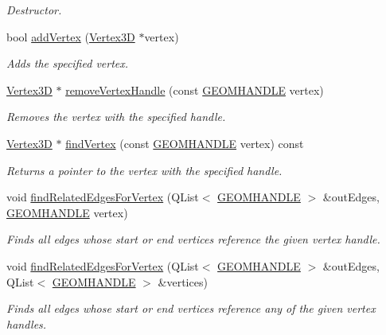 \begin{DoxyCompactItemize}
\begin{DoxyCompactList}\small\item\em Destructor. \end{DoxyCompactList}\item 
bool \hyperlink{class_solid3_d_ac02ad8ea1ca4d970c77ddc4c09b043cc}{add\-Vertex} (\hyperlink{class_vertex3_d}{Vertex3\-D} $\ast$vertex)
\begin{DoxyCompactList}\small\item\em Adds the specified vertex. \end{DoxyCompactList}\item 
\hyperlink{class_vertex3_d}{Vertex3\-D} $\ast$ \hyperlink{class_solid3_d_aefadc03bef752b5eeb52e80d67074980}{remove\-Vertex\-Handle} (const \hyperlink{vertex_8h_a72202e57358ed73cd212e9a2eaf39aeb}{G\-E\-O\-M\-H\-A\-N\-D\-L\-E} vertex)
\begin{DoxyCompactList}\small\item\em Removes the vertex with the specified handle. \end{DoxyCompactList}\item 
\hyperlink{class_vertex3_d}{Vertex3\-D} $\ast$ \hyperlink{class_solid3_d_ace3ab2ef41ff561973c10253b18add81}{find\-Vertex} (const \hyperlink{vertex_8h_a72202e57358ed73cd212e9a2eaf39aeb}{G\-E\-O\-M\-H\-A\-N\-D\-L\-E} vertex) const 
\begin{DoxyCompactList}\small\item\em Returns a pointer to the vertex with the specified handle. \end{DoxyCompactList}\item 
void \hyperlink{class_solid3_d_aa250bf5e45c3890a031ee7d10fd0a495}{find\-Related\-Edges\-For\-Vertex} (Q\-List$<$ \hyperlink{vertex_8h_a72202e57358ed73cd212e9a2eaf39aeb}{G\-E\-O\-M\-H\-A\-N\-D\-L\-E} $>$ \&out\-Edges, \hyperlink{vertex_8h_a72202e57358ed73cd212e9a2eaf39aeb}{G\-E\-O\-M\-H\-A\-N\-D\-L\-E} vertex)
\begin{DoxyCompactList}\small\item\em Finds all edges whose start or end vertices reference the given vertex handle. \end{DoxyCompactList}\item 
void \hyperlink{class_solid3_d_a84f5c532f14916e59ba99b339e19975e}{find\-Related\-Edges\-For\-Vertex} (Q\-List$<$ \hyperlink{vertex_8h_a72202e57358ed73cd212e9a2eaf39aeb}{G\-E\-O\-M\-H\-A\-N\-D\-L\-E} $>$ \&out\-Edges, Q\-List$<$ \hyperlink{vertex_8h_a72202e57358ed73cd212e9a2eaf39aeb}{G\-E\-O\-M\-H\-A\-N\-D\-L\-E} $>$ \&vertices)
\begin{DoxyCompactList}\small\item\em Finds all edges whose start or end vertices reference any of the given vertex handles. \end{DoxyCompactList}\item 

\end{DoxyCompactItemize}
